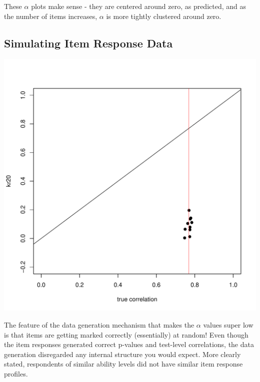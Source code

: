 \documentclass{article}\usepackage[]{graphicx}\usepackage[]{color}
\makeatletter
\def\maxwidth{ %
  \ifdim\Gin@nat@width>\linewidth
    \linewidth
  \else
    \Gin@nat@width
  \fi
}
\newenvironment{knitrout}{}{} %
\makeatother
\begin{document}
    These $\alpha$ plots make sense - they are centered around zero, as predicted, and as the number of items increases, $\alpha$ is more tightly clustered around zero.

  \subsection{Simulating Item Response Data}

\begin{knitrout}
\color{fgcolor}
\includegraphics[width=\maxwidth]{figure/unnamed-chunk-2-1} 

\end{knitrout}

The feature of the data generation mechanism that makes the $\alpha$ values super low is that items are getting marked correctly (essentially) at random!  Even though the item responses generated correct p-values and test-level correlations, the data generation disregarded any internal structure you would expect.  More clearly stated, respondents of similar ability levels did not have similar item response profiles.
\end{document}
